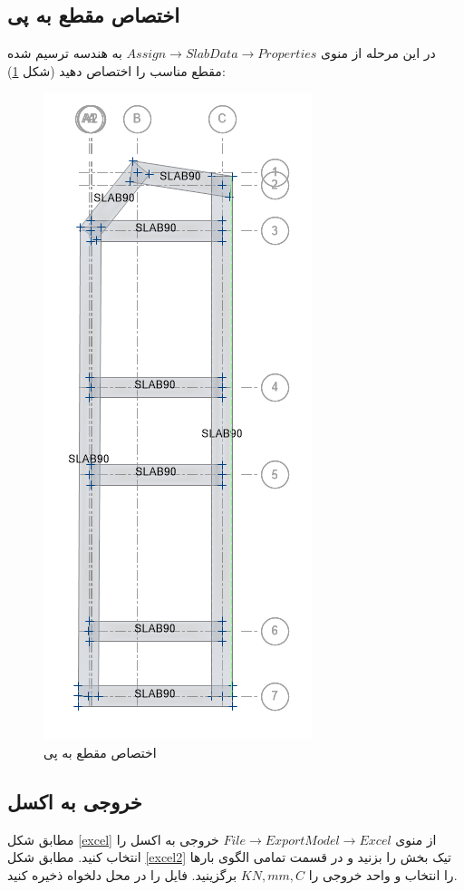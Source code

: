 \subsection{اختصاص مقطع به پی}
در این مرحله از منوی 
$Assign \rightarrow Slab Data \rightarrow Properties$
به هندسه ترسیم شده مقطع مناسب را اختصاص دهید (شکل 
\ref{assign}):

\begin{figure}[H]
    \centering
    \includegraphics[scale=.6]{figures/assign}
    \caption{اختصاص مقطع به پی}
    \label{assign}
\end{figure}


\subsection{خروجی به اکسل}
مطابق شکل 
\ref{excel}
از منوی 
$File \rightarrow Export Model \rightarrow Excel $
خروجی به اکسل را انتخاب کنید. مطابق شکل 
\ref{excel2}
تیک بخش
را بزنید و 
در قسمت 
تمامی الگوی بارها را انتخاب و واحد خروجی را 
$KN, mm, C$
برگزینید. فایل را در محل دلخواه ذخیره کنید.


